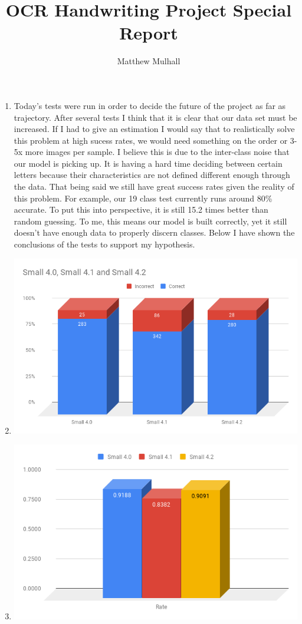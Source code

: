 \documentclass[12pt]{article} %
\title{OCR Handwriting Project Special Report}
\author{Matthew Mulhall}
\affil{matthew.l.mulhall@uconn.edu}
\begin{document}
\maketitle

\begin{enumerate}[label = (\roman*)]
\item Today's tests were run in order to decide the future of the project as far as trajectory. After several tests I think that it is clear that our data set must be increased. If I had to give an estimation I would say that to realistically solve this problem at high sucess rates, we would need something on the order or 3-5x more images per sample. I believe this is due to the inter-class noise that our model is picking up. It is having a hard time deciding between certain letters because their characteristics are not defined different enough through the data. That being said we still have great success rates given the reality of this problem. For example, our 19 class test currently runs around 80\% accurate. To put this into perspective, it is still 15.2 times better than random guessing. To me, this means our model is built correctly, yet it still doesn't have enough data to properly discern classes. Below I have shown the conclusions of the tests to support my hypothesis.
\item \includegraphics[scale=.7]{charts/overall}
\item\includegraphics[scale=.7]{charts/rate}

\end{enumerate}
\end{document}
